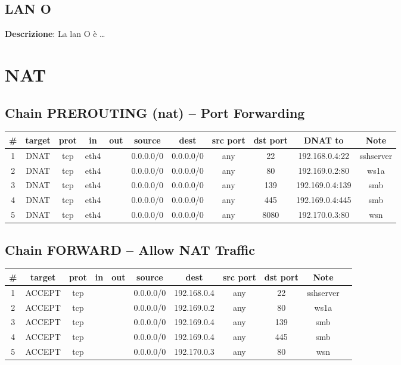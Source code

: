 \documentclass[a4paper,12pt]{article}
\begin{document}
\subsection{LAN O} \label{56-lan-o}
\textbf{Descrizione}: La lan O è \dots \\

\section{NAT}
\subsection*{Chain PREROUTING (nat) – Port Forwarding}
\begin{longtable}{ccccccccccc}
\toprule
\# & target & prot & in & out & source & dest & src port & dst port & DNAT to & Note \\
\midrule
1 & DNAT & tcp & eth4 & & 0.0.0.0/0 & 0.0.0.0/0 & any & 22 & 192.168.0.4:22 & sshserver \\
2 & DNAT & tcp & eth4 & & 0.0.0.0/0 & 0.0.0.0/0 & any & 80 & 192.169.0.2:80 & ws1a \\
3 & DNAT & tcp & eth4 & & 0.0.0.0/0 & 0.0.0.0/0 & any & 139 & 192.169.0.4:139 & smb \\
4 & DNAT & tcp & eth4 & & 0.0.0.0/0 & 0.0.0.0/0 & any & 445 & 192.169.0.4:445 & smb \\
5 & DNAT & tcp & eth4 & & 0.0.0.0/0 & 0.0.0.0/0 & any & 8080 & 192.170.0.3:80 & wsn \\
\bottomrule
\end{longtable}

\subsection*{Chain FORWARD – Allow NAT Traffic}
\begin{longtable}{ccccccccccc}
\toprule
\# & target & prot & in & out & source & dest & src port & dst port & Note \\
\midrule
1 & ACCEPT & tcp & & & 0.0.0.0/0 & 192.168.0.4 & any & 22 & sshserver \\
2 & ACCEPT & tcp & & & 0.0.0.0/0 & 192.169.0.2 & any & 80 & ws1a \\
3 & ACCEPT & tcp & & & 0.0.0.0/0 & 192.169.0.4 & any & 139 & smb \\
4 & ACCEPT & tcp & & & 0.0.0.0/0 & 192.169.0.4 & any & 445 & smb \\
5 & ACCEPT & tcp & & & 0.0.0.0/0 & 192.170.0.3 & any & 80 & wsn \\
\bottomrule
\end{longtable}
\end{document}
